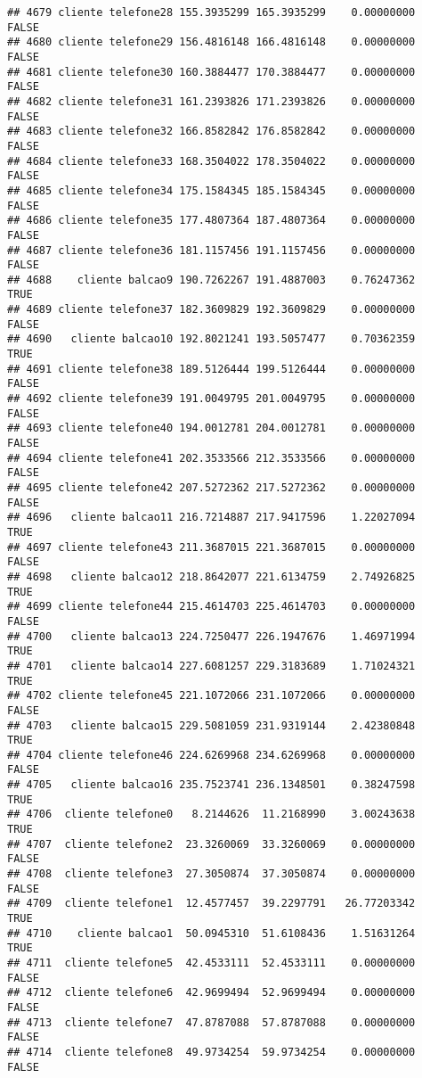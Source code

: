 \documentclass[
]{article}
\begin{document}
\begin{verbatim}
## 4679 cliente telefone28 155.3935299 165.3935299    0.00000000    FALSE
## 4680 cliente telefone29 156.4816148 166.4816148    0.00000000    FALSE
## 4681 cliente telefone30 160.3884477 170.3884477    0.00000000    FALSE
## 4682 cliente telefone31 161.2393826 171.2393826    0.00000000    FALSE
## 4683 cliente telefone32 166.8582842 176.8582842    0.00000000    FALSE
## 4684 cliente telefone33 168.3504022 178.3504022    0.00000000    FALSE
## 4685 cliente telefone34 175.1584345 185.1584345    0.00000000    FALSE
## 4686 cliente telefone35 177.4807364 187.4807364    0.00000000    FALSE
## 4687 cliente telefone36 181.1157456 191.1157456    0.00000000    FALSE
## 4688    cliente balcao9 190.7262267 191.4887003    0.76247362     TRUE
## 4689 cliente telefone37 182.3609829 192.3609829    0.00000000    FALSE
## 4690   cliente balcao10 192.8021241 193.5057477    0.70362359     TRUE
## 4691 cliente telefone38 189.5126444 199.5126444    0.00000000    FALSE
## 4692 cliente telefone39 191.0049795 201.0049795    0.00000000    FALSE
## 4693 cliente telefone40 194.0012781 204.0012781    0.00000000    FALSE
## 4694 cliente telefone41 202.3533566 212.3533566    0.00000000    FALSE
## 4695 cliente telefone42 207.5272362 217.5272362    0.00000000    FALSE
## 4696   cliente balcao11 216.7214887 217.9417596    1.22027094     TRUE
## 4697 cliente telefone43 211.3687015 221.3687015    0.00000000    FALSE
## 4698   cliente balcao12 218.8642077 221.6134759    2.74926825     TRUE
## 4699 cliente telefone44 215.4614703 225.4614703    0.00000000    FALSE
## 4700   cliente balcao13 224.7250477 226.1947676    1.46971994     TRUE
## 4701   cliente balcao14 227.6081257 229.3183689    1.71024321     TRUE
## 4702 cliente telefone45 221.1072066 231.1072066    0.00000000    FALSE
## 4703   cliente balcao15 229.5081059 231.9319144    2.42380848     TRUE
## 4704 cliente telefone46 224.6269968 234.6269968    0.00000000    FALSE
## 4705   cliente balcao16 235.7523741 236.1348501    0.38247598     TRUE
## 4706  cliente telefone0   8.2144626  11.2168990    3.00243638     TRUE
## 4707  cliente telefone2  23.3260069  33.3260069    0.00000000    FALSE
## 4708  cliente telefone3  27.3050874  37.3050874    0.00000000    FALSE
## 4709  cliente telefone1  12.4577457  39.2297791   26.77203342     TRUE
## 4710    cliente balcao1  50.0945310  51.6108436    1.51631264     TRUE
## 4711  cliente telefone5  42.4533111  52.4533111    0.00000000    FALSE
## 4712  cliente telefone6  42.9699494  52.9699494    0.00000000    FALSE
## 4713  cliente telefone7  47.8787088  57.8787088    0.00000000    FALSE
## 4714  cliente telefone8  49.9734254  59.9734254    0.00000000    FALSE

\end{verbatim}
\end{document}
